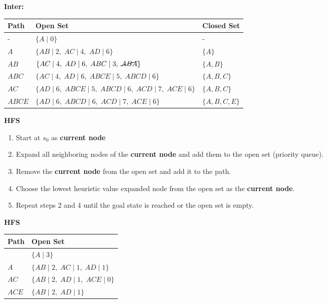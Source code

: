\begin{example}
    \textbf{Inter:}
    \begin{center}
        \begin{tabular}{lll}
        \toprule
        \textbf{Path} & \textbf{Open Set} & \textbf{Closed Set} \\
        \midrule
        - & $\{A \mid 0\}$ & - \\
        $A$ & $\{AB \mid 2, \; AC \mid 4, \; AD \mid 6\}$ & $\{A\}$ \\
        $AB$ & $\{AC \mid 4, \; AD \mid 6, \; ABC \mid 3, \; \cancel{ABA} \} $ & $\{A, B\}$ \\
        $ABC$ & $\{AC \mid 4, \; AD \mid 6, \; ABCE \mid 5, \; ABCD \mid 6\} $ & $\{A, B, C\}$ \\
        $AC$ & $\{AD \mid 6, \; ABCE \mid 5, \; ABCD \mid 6, \; ACD \mid 7, \; ACE \mid 6\}$ & $\{A, B, C\}$ \\
        $ABCE$ & $\{AD \mid 6, \; ABCD \mid 6, \; ACD \mid 7, \; ACE \mid 6\}$ & $\{A, B, C, E\}$ \\
        \bottomrule
        \end{tabular}
    \end{center}
\end{example}
\newpage

\begin{process} \textbf{HFS}
    \begin{enumerate}
        \item Start at $s_0$ as \textbf{current node}
        \item Expand all neighboring nodes of the \textbf{current node} and add them to the open set (priority queue).
        \item Remove the \textbf{current node} from the open set and add it to the path. 
        \item Choose the lowest heuristic value expanded node from the open set as the \textbf{current node}.
        \item Repeat steps 2 and 4 until the goal state is reached or the open set is empty.
    \end{enumerate}
\end{process}

\begin{example} \textbf{HFS}
    \begin{center}
        \begin{tabular}{ll}
        \toprule
        \textbf{Path} & \textbf{Open Set} \\
        \midrule
         & $\{A \mid 3\}$ \\
        $A$ & $\{AB \mid 2, \; AC \mid 1, \; AD \mid 1\}$ \\
        $AC$ & $\{AB \mid 2, \; AD \mid 1, \; ACE \mid 0\}$ \\
        $ACE$ & $\{AB \mid 2, \; AD \mid 1\}$ \\
        \bottomrule
        \end{tabular}
    \end{center}
\end{example}
\newpage


